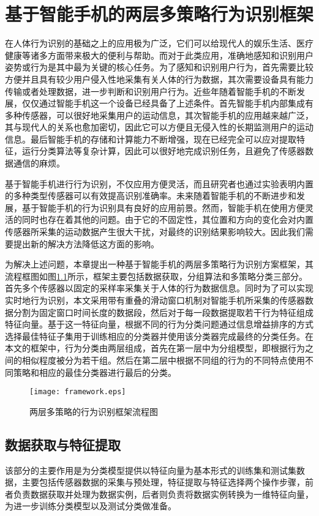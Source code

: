 ﻿\chapter{基于智能手机的两层多策略行为识别框架}

\par 在人体行为识别的基础之上的应用极为广泛，它们可以给现代人的娱乐生活、医疗健康等诸多方面带来极大的便利与帮助。而对于此类应用，准确地感知和识别用户姿势或行为是其中最为关键的核心任务。为了感知和识别用户行为，首先需要比较方便并且具有较少用户侵入性地采集有关人体的行为数据，其次需要设备具有能力传输或者处理数据，进一步判断和识别用户行为。近些年随着智能手机的不断发展，仅仅通过智能手机这一个设备已经具备了上述条件。首先智能手机内部集成有多种传感器，可以很好地采集用户的运动信息，其次智能手机的应用越来越广泛，其与现代人的关系也愈加密切，因此它可以方便且无侵入性的长期监测用户的运动信息。最后智能手机的存储和计算能力不断增强，现在已经完全可以应对提取特征，运行分类算法等复杂计算，因此可以很好地完成识别任务，且避免了传感器数据通信的麻烦。
\par 基于智能手机进行行为识别，不仅应用方便灵活，而且研究者也通过实验表明内置的多种类型传感器可以有效提高识别准确率。未来随着智能手机的不断进步和发展，基于智能手机的行为识别具有良好的应用前景。然而，智能手机在使用方便灵活的同时也存在着其他的问题。由于它的不固定性，其位置和方向的变化会对内置传感器所采集的运动数据产生很大干扰，对最终的识别结果影响较大。因此我们需要提出新的解决方法降低这方面的影响。
\par 为解决上述问题，本章提出一种基于智能手机的两层多策略行为识别方案框架，其流程框图如图\ref{framework}所示，框架主要包括数据获取，分组算法和多策略分类三部分。首先多个传感器以固定的采样率采集关于人体的行为数据信息。同时为了可以实现实时地行为识别，本文采用带有重叠的滑动窗口机制对智能手机所采集的传感器数据分割为固定窗口时间长度的数据段，然后对于每一段数据提取若干行为特征组成特征向量。基于这一特征向量，根据不同的行为分类问题通过信息增益排序的方式选择最佳特征子集用于训练相应的分类器并使用该分类器完成最终的分类任务。在本文的框架中，行为分类由两层组成，首先在第一层中为分组模型，即根据行为之间的相似程度被分为若干组。然后在第二层中根据不同组的行为的不同特点使用不同策略和相应的最佳分类器进行最后的分类。
\begin{figure}[ht]
\centering
\texttt{[image: framework.eps]}
\caption{两层多策略的行为识别框架流程图} \label{framework}
\end{figure}

\section{数据获取与特征提取}
\par 该部分的主要作用是为分类模型提供以特征向量为基本形式的训练集和测试集数据，主要包括传感器数据的采集与预处理，特征提取与特征选择两个操作步骤，前者负责数据获取并处理为数据实例，后者则负责将数据实例转换为一维特征向量，为进一步训练分类模型以及测试分类做准备。

